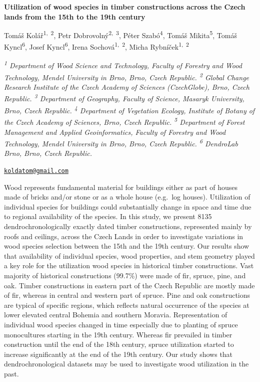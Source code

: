 \documentclass[
]{book}
\begin{document}
\textbf{Utilization of wood species in timber constructions across the Czech lands from the 15th to the 19th century}

Tomáš Kolář\textsuperscript{1,~2}, Petr Dobrovolný\textsuperscript{2,~3}, Péter Szabó\textsuperscript{4}, Tomáš Mikita\textsuperscript{5}, Tomáš Kyncl\textsuperscript{6}, Josef Kyncl\textsuperscript{6}, Irena Sochová\textsuperscript{1,~2}, Micha Rybníček\textsuperscript{1,~2}

\emph{\textsuperscript{1} Department of Wood Science and Technology, Faculty of Forestry and Wood Technology, Mendel University in Brno, Brno, Czech Republic. \textsuperscript{2} Global Change Research Institute of the Czech Academy of Sciences (CzechGlobe), Brno, Czech Republic. \textsuperscript{3} Department of Geography, Faculty of Science, Masaryk University, Brno, Czech Republic. \textsuperscript{4} Department of Vegetation Ecology, Institute of Botany of the Czech Academy of Sciences, Brno, Czech Republic. \textsuperscript{5} Department of Forest Management and Applied Geoinformatics, Faculty of Forestry and Wood Technology, Mendel University in Brno, Brno, Czech Republic. \textsuperscript{6} DendroLab Brno, Brno, Czech Republic.}

\href{mailto:koldatom@gmail.com}{\nolinkurl{koldatom@gmail.com}}

Wood represents fundamental material for buildings either as part of houses made of bricks and/or stone or as a whole house (e.g.~log houses). Utilization of individual species for buildings could substantially change in space and time due to regional availability of the species. In this study, we present 8135 dendrochronologically exactly dated timber constructions, represented mainly by roofs and ceilings, across the Czech Lands in order to investigate variations in wood species selection between the 15th and the 19th century. Our results show that availability of individual species, wood properties, and stem geometry played a key role for the utilization wood species in historical timber constructions. Vast majority of historical constructions (99.7\%) were made of fir, spruce, pine, and oak. Timber constructions in eastern part of the Czech Republic are mostly made of fir, whereas in central and western part of spruce. Pine and oak constructions are typical of specific regions, which reflects natural occurrence of the species at lower elevated central Bohemia and southern Moravia. Representation of individual wood species changed in time especially due to planting of spruce monocultures starting in the 19th century. Whereas fir prevailed in timber construction until the end of the 18th century, spruce utilization started to increase significantly at the end of the 19th century. Our study shows that dendrochronological datasets may be used to investigate wood utilization in the past.
\end{document}
